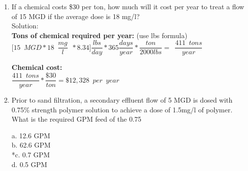 \begin{enumerate}
\item If a chemical costs \$30 per ton, how much will it cost per year to treat a flow of 15 MGD if the average dose is 18 mg/l?\\
Solution:\\
\textbf{Tons of chemical required per year:} (use lbs formula)\\ $\Big[15 \enspace MGD * 18 \enspace \dfrac{mg}{l}\enspace*8.34\Big]\dfrac{lbs}{day}* 365 \dfrac{days}{year}*\dfrac{ton}{2000lbs}=\enspace \dfrac{411 \enspace tons}{year}$

\textbf{Chemical cost:}\\
$\dfrac{411 \enspace tons}{year}*\dfrac{\$30}{ton}=\boxed{\$12,328 \enspace per \enspace year}$\\
\vspace{0.25cm}

\item Prior to sand filtration, a secondary effluent flow of 5 MGD is dosed with 0.75\% strength polymer solution to achieve a dose of 1.5mg/l of polymer. What is the required GPM feed of the 0.75%

a. 12.6 GPM \\
b. 62.6 GPM \\
*c. 0.7 GPM \\
d. 0.5 GPM 





\end{enumerate}

